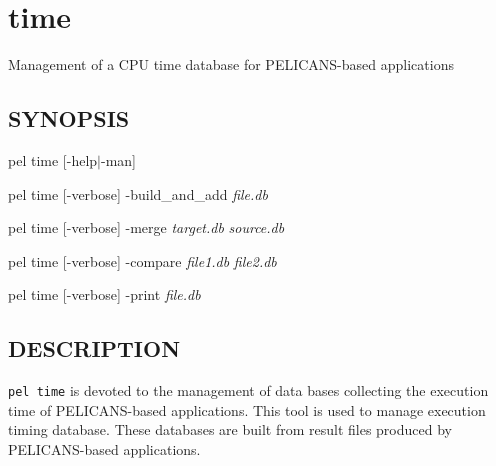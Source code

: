 \documentclass{article}
\begin{document}
\section{time\label{time}}


Management of a CPU time database for PELICANS-based applications

\subsection*{SYNOPSIS\label{time_SYNOPSIS}}


pel time [-help$|$-man]



pel time [-verbose] -build\_and\_add \emph{file.db}



pel time [-verbose] -merge \emph{target.db} \emph{source.db}



pel time [-verbose] -compare \emph{file1.db} \emph{file2.db}



pel time [-verbose] -print \emph{file.db}

\subsection*{DESCRIPTION\label{time_DESCRIPTION}}


\texttt{pel time} is devoted to the management of
data bases collecting the execution time of PELICANS-based applications.
This tool is used to manage execution timing database.
These databases are built from result files produced by PELICANS-based applications.
\end{document}
